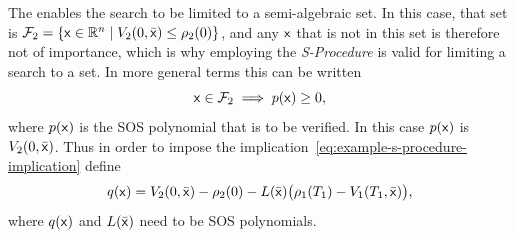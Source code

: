 The  enables the search to be limited to a
semi-algebraic set. In this case, that set is \(\mathcal{F}_2 = \lbrace{\mathbf{\mathsf{x}}}
  \in \mathbb{R}^n \mid V_2(0,\bar{{\mathbf{\mathsf{x}}}}) \leq \rho_2(0)\rbrace\), and any \({\mathbf{\mathsf{x}}}\)
that is not in this set is therefore not of importance, which is why employing
the \textit{S-Procedure} is valid for limiting a search to a set. In more
general terms this can be written
\begin{equation}
  \label{eq:example-s-procedure-implication}
  {\mathbf{\mathsf{x}}} \in \mathcal{F}_2 \implies p({\mathbf{\mathsf{x}}}) \geq 0,
\end{equation}
where \(p({\mathbf{\mathsf{x}}})\) is the \ac{SOS} polynomial that is to be verified. In this
case \(p({\mathbf{\mathsf{x}}})\) is \(V_2(0,\bar{{\mathbf{\mathsf{x}}}})\). Thus in order to impose the
implication~\eqref{eq:example-s-procedure-implication} define
\begin{equation}
  q({\mathbf{\mathsf{x}}}) = V_2(0,\bar{{\mathbf{\mathsf{x}}}}) - \rho_2(0) - L(\bar{{\mathbf{\mathsf{x}}}}) \bigl(
    \rho_1(T_1) - V_1(T_1,\bar{{\mathbf{\mathsf{x}}}}) \bigr),
\end{equation}
where \(q({\mathbf{\mathsf{x}}})\) and \(L(\bar{{\mathbf{\mathsf{x}}}})\) need to be SOS polynomials.

